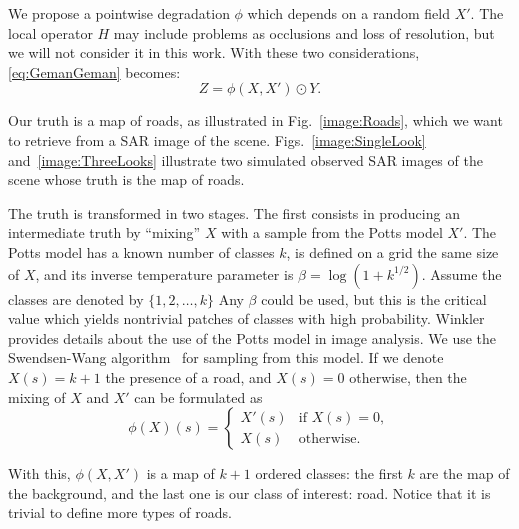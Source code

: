 \documentclass[journal]{IEEEtran}
\begin{document}
We propose a pointwise degradation $\phi$ which depends on a random field $X'$.
The local operator $H$ may include problems as occlusions and loss of resolution, but we will not consider it in this work.
With these two considerations, \eqref{eq:GemanGeman} becomes:
\begin{equation}
Z = \phi(X,X') \odot Y.
\label{eq:OurModel}
\end{equation}

Our truth is a map of roads, as illustrated in Fig.~\ref{image:Roads}, which we want to retrieve from a SAR image of the scene.
Figs.~\ref{image:SingleLook} and~\ref{image:ThreeLooks} illustrate two simulated observed SAR images of the scene whose truth is the map of roads.

The truth is transformed in two stages.
The first consists in producing an intermediate truth by ``mixing'' $X$ with a sample from the Potts model $X'$.
The Potts model has a known number of classes $k$, is defined on a grid the same size of $X$, and its inverse temperature parameter is $\beta=\log(1+k^{1/2})$.
Assume the classes are denoted by $\{1,2,\dots,k\}$
Any $\beta$ could be used, but this is the critical value which yields nontrivial patches of classes with high probability.
Winkler~\cite{Winkler2006} provides details about the use of the Potts model in image analysis.
We use the Swendsen-Wang algorithm~\cite{SwendsenWang87} for sampling from this model.
If we denote $X(s)=k+1$ the presence of a road, and $X(s)=0$ otherwise, then the mixing of $X$ and $X'$ can be formulated as
$$
\phi(X) (s)= \left\{
	\begin{array}{cl}
	X'(s)	& \text{if } X(s) = 0,\\
	X(s)	& \text{otherwise.}
	\end{array}
\right.
$$

With this, $\phi(X,X')$ is a map of $k+1$ ordered classes: the first $k$ are the map of the background, and the last one is our class of interest: road.
Notice that it is trivial to define more types of roads.
\end{document}
